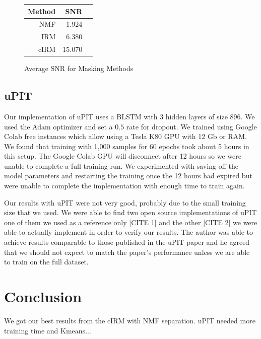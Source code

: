 \documentclass[journal, a4paper]{IEEEtran}
\begin{document}
\begin{figure}[h!]
    \centering  
     \caption{\label{Fig:masking_snr}Average SNR for Masking Methods}  

  \begin{tabular}{r r r}\\
  
        Method & SNR \\
        \midrule
        NMF & 1.924 \\
        IRM & 6.380 \\
        cIRM & 15.070 \\
        \midrule
    \end{tabular}
    
\end{figure}

\subsection{uPIT}

Our implementation of uPIT uses a BLSTM with 3 hidden layers of size 896. We used the Adam optimizer and set a $0.5$ rate for dropout. We trained using Google Colab free instances which allow using a Tesla K80 GPU with 12 Gb or RAM. We found that training with 1,000 samples for 60 epochs took about 5 hours in this setup. The Google Colab GPU will disconnect after 12 hours so we were unable to complete a full training run. We experimented with saving off the model parameters and restarting the training once the 12 hours had expired but were unable to complete the implementation with enough time to train again.

Our results with uPIT were not very good, probably due to the small training size that we used. We were able to find two open source implementations of uPIT one of them we used as a reference only [CITE 1] and the other [CITE 2] we were able to actually implement in order to verify our results. The author was able to achieve results comparable to those published in the uPIT paper and he agreed that we should not expect to match the paper's performance unless we are able to train on the full dataset.



\section{Conclusion}
We got our best results from the cIRM with NMF separation. uPIT needed more training time and Kmeans...




\end{document}
